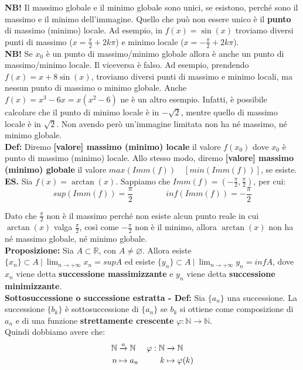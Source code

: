 \documentclass{article}
\begin{document}
\noindent\textbf{NB!} Il massimo globale e il minimo globale sono unici, se esistono, perché sono il massimo e il minimo dell'immagine. Quello che può non essere unico è il \textbf{punto} di massimo (minimo) locale. Ad esempio, in $f(x) = \sin(x)$ troviamo diversi punti di massimo ($x = \frac{\pi}{2} + 2k\pi$) e minimo locale ($x = -\frac{\pi}{2} + 2k\pi$).\\

\noindent\textbf{NB!} Se $x_0$ è un punto di massimo/minimo globale allora è anche un punto di massimo/minimo locale. Il viceversa è falso. Ad esempio, prendendo $f(x) = x + 8\sin(x)$, troviamo diversi punti di massimo e minimo locali, ma nessun punto di massimo o minimo globale. Anche $f(x) = x^3 - 6x = x(x^2 - 6)$ ne è un altro esempio. Infatti, è possibile calcolare che il punto di minimo locale è in $-\sqrt{2}$, mentre quello di massimo locale è in $\sqrt{2}$. Non avendo però un'immagine limitata non ha né massimo, né minimo globale.\\

\noindent\textbf{Def:} Diremo \textbf{[valore] massimo (minimo) locale} il valore $f(x_0)$ dove $x_0$ è punto di massimo (minimo) locale. Allo stesso modo, diremo \textbf{[valore] massimo (minimo) globale} il valore $max(Imm(f)) \quad [min(Imm(f))]$, se esiste.\\

\noindent\textbf{ES.} Sia $f(x) = \arctan(x)$. Sappiamo che $Imm(f) = (-\frac{\pi}{2}, \frac{\pi}{2})$, per cui:
\begin{equation*}
    sup(Imm(f)) = \frac{\pi}{2} \qquad \qquad inf(Imm(f)) = -\frac{\pi}{2}
\end{equation*}

\noindent Dato che $\frac{\pi}{2}$ non è il massimo perché non esiste alcun punto reale in cui $\arctan(x)$ valga $\frac{\pi}{2}$, così come $-\frac{\pi}{2}$ non è il minimo, allora $\arctan(x)$ non ha né massimo globale, né minimo globale.\\

\noindent\textbf{Proposizione:} Sia $A \subset \mathbb{R}$, con $A \neq \varnothing$. Allora esiste $\{x_n\} \subset A \ | \ \lim_{n \to +\infty} x_n = supA$ ed esiste $\{y_n\} \subset A \ | \ \lim_{n \to +\infty} y_n = infA$, dove $x_n$ viene detta \textbf{successione massimizzante} e $y_n$ viene detta \textbf{successione minimizzante}.\\

\noindent\textbf{Sottosuccessione o successione estratta - Def:} Sia $\{a_n\}$ una successione. La successione $\{b_k\}$ è sottosuccessione di $\{a_n\}$ se $b_k$ si ottiene come composizione di $a_n$ e di una funzione \textbf{strettamente crescente} $\varphi: \mathbb{N} \xrightarrow{} \mathbb{N}$. \\
Quindi dobbiamo avere che: 
\begin{align*}
    \mathbb{N} & \xrightarrow{\mathrlap{a}\ } \mathbb{N} & \varphi: \mathbb{N} & \xrightarrow{} \mathbb{N} \\
    n & \mapsto a_n & k & \mapsto \varphi(k)
\end{align*}
\end{document}

